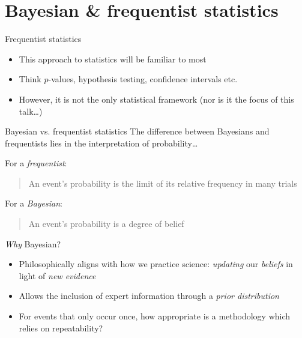 \documentclass[aspectratio=169]{beamer}
\begin{document}
\section{Bayesian \& frequentist statistics}

\begin{frame}{Frequentist statistics}
  \begin{itemize}
    \item This approach to statistics will be familiar to most
    \item Think $p$-values, hypothesis testing, confidence intervals etc.
    \item However, it is not the only statistical framework (nor is it the 
      focus of this talk\ldots)
  \end{itemize}
\end{frame}

\begin{frame}{Bayesian vs. frequentist statistics}
  The difference between Bayesians and frequentists lies in the interpretation
  of probability\ldots

  For a \emph{frequentist}:\\\vspace{0.25cm}
  \begin{quote}
    {\normalfont An event's probability is the limit of its \alert{relative
  	frequency in many trials}}
  \end{quote}

  For a \emph{Bayesian}:\\\vspace{0.25cm}
  \begin{quote}
    {\normalfont An event's probability is a \alert{degree of belief}}
  \end{quote}
\end{frame}

\begin{frame}{\emph{Why} Bayesian?}
  \begin{itemize}
    \item Philosophically aligns with how we practice science: \emph{updating}
      our \emph{beliefs} in light of \emph{new evidence}
    \item Allows the inclusion of expert information through a \emph{prior
      distribution}
    \item For events that only occur once, how appropriate is a methodology
      which relies on repeatability?
  \end{itemize}
\end{frame}
\end{document}
